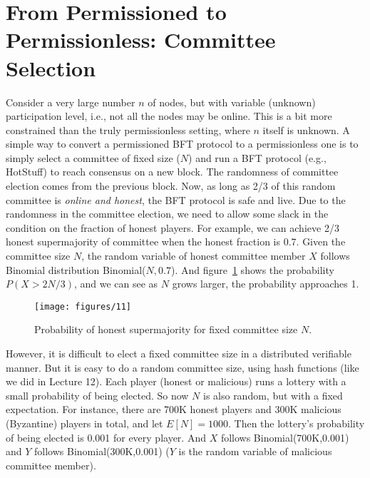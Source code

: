 \documentclass{article}
\begin{document}

\section*{From Permissioned to Permissionless: Committee Selection}
Consider a very large number $n$ of nodes, but with variable (unknown) participation level, i.e., not all the nodes may be online. This is a bit more constrained than the truly permissionless setting, where $n$ itself is unknown. 
A simple way to  convert a permissioned BFT protocol to a permissionless one is to simply select a committee of fixed size ($N$) and run a BFT protocol (e.g., HotStuff) to reach consensus on a new block. The randomness of committee election comes from the previous block. Now, as long as 2/3 of this random committee is {\em online and honest}, the BFT protocol is safe and live. Due to the randomness in the committee election, we need to allow some slack in the condition on the   fraction of honest players. For example, we can achieve 2/3 honest supermajority of committee when the honest fraction is 0.7. Given the committee size $N$, the random variable of honest committee member $X$ follows Binomial distribution Binomial($N,0.7$). And figure~\ref{fig:1} shows the probability $P(X> 2N/3)$, and we can see as $N$ grows larger, the probability approaches 1.
\begin{figure}[htb]
    \centering
    \texttt{[image: figures/11]}
    \caption{Probability of honest supermajority for fixed committee size $N$.}
    \label{fig:1}
\end{figure}

However, it is difficult to elect a  fixed committee size in a distributed verifiable manner.  But it is easy to do a random committee size, using hash functions (like we did in Lecture 12). Each player (honest or malicious) runs a lottery with a small probability of being elected. So now $N$ is also random, but with a fixed expectation. For instance, there are 700K honest players and 300K malicious (Byzantine) players in total, and let $E[N]=1000$. Then the lottery's probability of being elected is 0.001 for every player. And $X$ follows Binomial(700K,0.001) and $Y$ follows Binomial(300K,0.001) ($Y$ is the random variable of malicious committee member).
\end{document}
